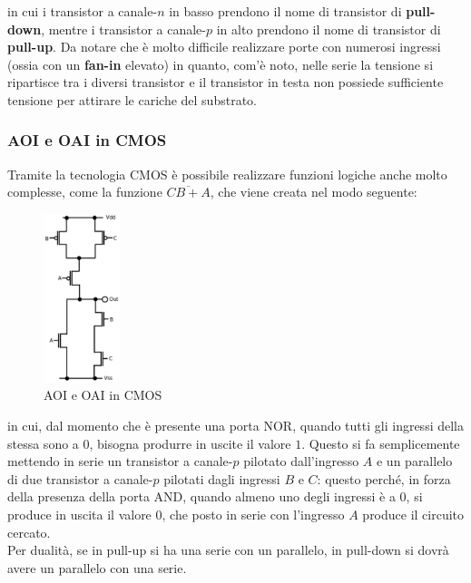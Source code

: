\documentclass[a4paper]{extarticle}
\begin{document}
\vspace{1em}
\noindent
in cui i transistor a canale-$n$ in basso prendono il nome di transistor di \textbf{pull-down}, mentre i transistor a canale-$p$ in alto prendono il nome di transistor di \textbf{pull-up}. Da notare che è molto difficile realizzare porte con numerosi ingressi (ossia con un \textbf{fan-in} elevato) in quanto, com'è noto, nelle serie la tensione si ripartisce tra i diversi transistor e il transistor in testa non possiede sufficiente tensione per attirare le cariche del substrato.

\vspace{1em}
\noindent
\subsubsection{AOI e OAI in CMOS}
Tramite la tecnologia CMOS è possibile realizzare funzioni logiche anche molto complesse, come la funzione $\overline{CB + A}$, che viene creata nel modo seguente:

\begin{figure}[H]
    \centering
    \includegraphics[width=0.2\textwidth]{aoi-oai-cmos.png}
    \caption{AOI e OAI in CMOS}
    \label{fig:aoi_oai_cmos}
\end{figure}

\vspace{1em}
\noindent
in cui, dal momento che è presente una porta NOR, quando tutti gli ingressi della stessa sono a $0$, bisogna produrre in uscite il valore $1$. Questo si fa semplicemente mettendo in serie un transistor a canale-$p$ pilotato dall'ingresso $A$ e un parallelo di due transistor a canale-$p$ pilotati dagli ingressi $B$ e $C$: questo perché, in forza della presenza della porta AND, quando almeno uno degli ingressi è a $0$, si produce in uscita il valore $0$, che posto in serie con l'ingresso $A$ produce il circuito cercato.\\
Per dualità, se in pull-up si ha una serie con un parallelo, in pull-down si dovrà avere un parallelo con una serie.
\end{document}
